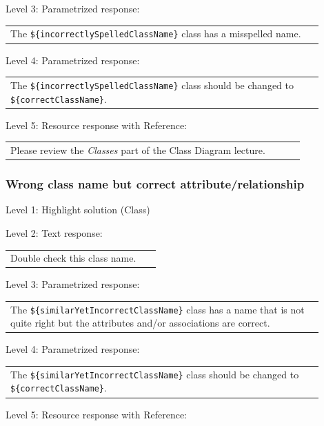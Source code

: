 \noindent Level 3: Parametrized response: \medskip

\begin{tabular}{|p{0.9\linewidth}}
The \verb|${incorrectlySpelledClassName}| class has a misspelled name.
\end{tabular} \medskip

\noindent Level 4: Parametrized response: \medskip

\begin{tabular}{|p{0.9\linewidth}}
The \verb|${incorrectlySpelledClassName}| class should be changed to \verb|${correctClassName}|.
\end{tabular} \medskip

\noindent Level 5: Resource response with Reference: \medskip

\begin{tabular}{|p{0.9\linewidth}}
Please review the \textit{Classes} part of the Class Diagram lecture.
\end{tabular} \medskip


\subsubsection{Wrong class name but correct attribute/relationship}

\noindent Level 1: Highlight solution (Class) \medskip

\noindent Level 2: Text response: \medskip

\begin{tabular}{|p{0.9\linewidth}}
Double check this class name.
\end{tabular} \medskip

\noindent Level 3: Parametrized response: \medskip

\begin{tabular}{|p{0.9\linewidth}}
The \verb|${similarYetIncorrectClassName}| class has a name that is not quite right but the attributes and/or associations are correct.
\end{tabular} \medskip

\noindent Level 4: Parametrized response: \medskip

\begin{tabular}{|p{0.9\linewidth}}
The \verb|${similarYetIncorrectClassName}| class should be changed to \verb|${correctClassName}|.
\end{tabular} \medskip

\noindent Level 5: Resource response with Reference: \medskip

